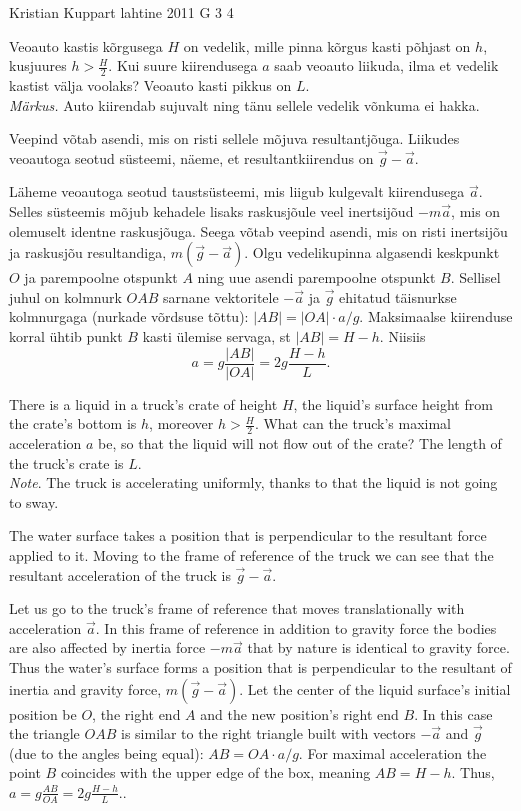 {Kristian Kuppart} %
{lahtine} %
{2011} %
{G 3} %
{4} %
{
\ifStatement
Veoauto kastis kõrgusega $H$ on vedelik, mille pinna kõrgus kasti põhjast on 
$h$, kusjuures $h > \frac{H}{2}$. Kui suure kiirendusega $a$ saab veoauto 
liikuda, ilma et vedelik kastist välja voolaks? Veoauto kasti pikkus on $L$.\\
\textit{Märkus.} Auto kiirendab sujuvalt ning tänu sellele vedelik võnkuma ei hakka.
\fi


\ifHint
Veepind võtab asendi, mis on risti sellele mõjuva resultantjõuga. Liikudes veoautoga seotud süsteemi, näeme, et resultantkiirendus on $\vec g - \vec a$.
\fi


\ifSolution
Läheme veoautoga seotud taustsüsteemi, mis liigub kulgevalt kiirendusega $\vec a$. Selles süsteemis mõjub
kehadele lisaks raskusjõule veel inertsijõud $-m\vec a$, mis on olemuselt identne raskusjõuga.
Seega võtab veepind asendi, mis on risti inertsijõu ja raskusjõu resultandiga, $m(\vec g-\vec a)$.
Olgu vedelikupinna algasendi keskpunkt $O$ ja parempoolne otspunkt $A$ ning uue asendi parempoolne otspunkt $B$.
Sellisel juhul on kolmnurk $OAB$ sarnane vektoritele $-\vec a$ ja $\vec g$ ehitatud täisnurkse kolmnurgaga (nurkade võrdsuse tõttu):
$|AB|=|OA|\cdot a/g$. Maksimaalse kiirenduse korral ühtib punkt $B$ kasti ülemise servaga, st $|AB|=H-h$. Niisiis
\[
a=g\frac{|AB|}{|OA|}=2g\frac {H-h}{L}.
\]
\fi


\ifEngStatement
There is a liquid in a truck’s crate of height $H$, the liquid’s surface height from the crate’s bottom is $h$, moreover $h > \frac{H}{2}$. What can the truck’s maximal acceleration $a$ be, so that the liquid will not flow out of the crate? The length of the truck’s crate is $L$.\\
\emph{Note}. The truck is accelerating uniformly, thanks to that the liquid is not going to sway.
\fi


\ifEngHint
The water surface takes a position that is perpendicular to the resultant force applied to it. Moving to the frame of reference of the truck we can see that the resultant acceleration of the truck is $\vec g - \vec a$.
\fi


\ifEngSolution
Let us go to the truck’s frame of reference that moves translationally with acceleration $\vec a$. In this frame of reference in addition to gravity force the bodies are also affected by inertia force $-m\vec a$ that by nature is identical to gravity force. Thus the water’s surface forms a position that is perpendicular to the resultant of inertia and gravity force, $m(\vec g-\vec a)$. Let the center of the liquid surface’s initial position be $O$, the right end $A$ and the new position’s right end $B$. In this case the triangle $OAB$ is similar to the right triangle built with vectors $-\vec a$ and $\vec g$ (due to the angles being equal): $AB=OA\cdot a/g$. For maximal acceleration the point $B$ coincides with the upper edge of the box, meaning $AB=H-h$. Thus, $a=g\frac {AB}{OA}=2g\frac {H-h}{L}.$.
\fi
}